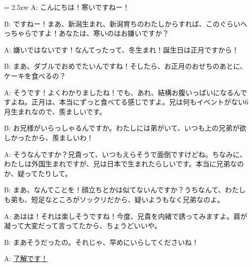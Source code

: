 \documentclass[11pt]{amsart}
\title{}
\author{}
\newenvironment{hangall}[1]{\hangindent = 2.5zw\everypar{\hangindent = 2.5zw}}{}
\begin{document}
\maketitle
\begin{hangall}{}%
A: こんにちは！寒いですねー！

B: ですねー！まあ、新潟生まれ、新潟育ちのわたしからすれば、このぐらいへっちゃらですよ！あなたは、寒いのはお嫌いですか？

A: 嫌いではないです！なんてったって、冬生まれ！誕生日は正月ですから！

B: まあ、ダブルでおめでたいんですね！そしたら、お正月のおせちのあとに、ケーキを食べるの？

A: そうです！よくわかりましたね！でも、あれ、結構お腹いっぱいになるんですよね。正月は、本当にずっと食べてる感じですよ。兄は何もイベントがない6月生まれなので、羨ましいです。

B: お兄様がいらっしゃるんですか。わたしには弟がいて、いつも上の兄弟が欲しかったから、羨ましいわ！

A: そうなんですか？兄貴って、いつもえらそうで面倒ですけどね。ちなみに、わたしは外国生まれですが、兄は日本で生まれたらしいです。本当に兄弟なのか、疑ってたりして。

B: まあ、なんてことを！顔立ちとかは似てないんですか？うちなんて、わたしも弟も、短足なところがソックリだから、疑いようもなく兄弟なのよ。

A: あはは！それは楽しそうですね！今度、兄貴を内緒で誘ってみますよ。肩が凝って大変だって言ってたから、ちょうどいいや。

B: まあそうだったの。それじゃ、早めにいらしてくださいね！

A: \ul{了解です！}\end{hangall}
\end{document}
